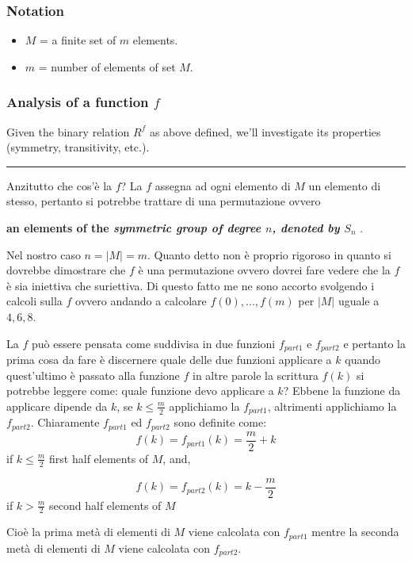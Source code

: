 \documentclass{article}
\begin{document}
\subsubsection{Notation}
\begin{itemize}
 \item $M$ = a finite set of $m$ elements.
 \item $m$ = number of elements of set $M$. 
\end{itemize}


\subsubsection{Analysis of a function $f$}
Given the binary relation $R^f$ as above defined, we'll investigate its properties (symmetry, transitivity, etc.). 

\noindent
{\color{blue} \rule{\linewidth}{0.5mm} }

Anzitutto che cos'\`e la $f$? La $f$ assegna ad ogni elemento di $M$ un elemento di stesso, pertanto si potrebbe trattare di una permutazione ovvero 

\textbf{an elements of the \emph{symmetric group of degree $n$, denoted by $S_n$}} \cite{herstein1999}. 

Nel nostro caso $n=|M|=m$. Quanto detto non \`e proprio rigoroso in quanto si dovrebbe dimostrare che $f$ \`e una permutazione ovvero dovrei fare vedere che la $f$ \`e sia iniettiva che suriettiva. Di questo fatto me ne sono accorto svolgendo i calcoli sulla $f$ ovvero andando a calcolare $f(0),...,f(m)$ per $|M|$ uguale a $4,6,8$. 

La $f$ pu\`o essere pensata come suddivisa in due funzioni $f_{part1}$ e $f_{part2}$ e pertanto la prima cosa da fare \`e discernere quale delle due funzioni applicare a $k$ quando quest'ultimo \`e passato alla funzione $f$ in altre parole la scrittura $f(k)$ si potrebbe leggere come: quale funzione devo applicare a $k$? Ebbene la funzione da applicare dipende da $k$, se $k \le \frac{m}{2}$ applichiamo la $f_{part1}$, altrimenti applichiamo la $f_{part2}$. Chiaramente $f_{part1}$ ed $f_{part2}$ sono definite come: \\

\[
 f(k) = f_{part1} (k) = \frac{m}{2}+k
\]
if $k \le \frac{m}{2}$ first half elements of $M$, and,

\[
 f(k) = f_{part2} (k) = k - \frac{m}{2}
\]
if $k > \frac{m}{2}$ second half elements of $M$

Cio\`e la prima met\`a di elementi di $M$ viene calcolata con $f_{part1}$ mentre la seconda met\`a di elementi di $M$ viene calcolata con $f_{part2}$. 
\end{document}
